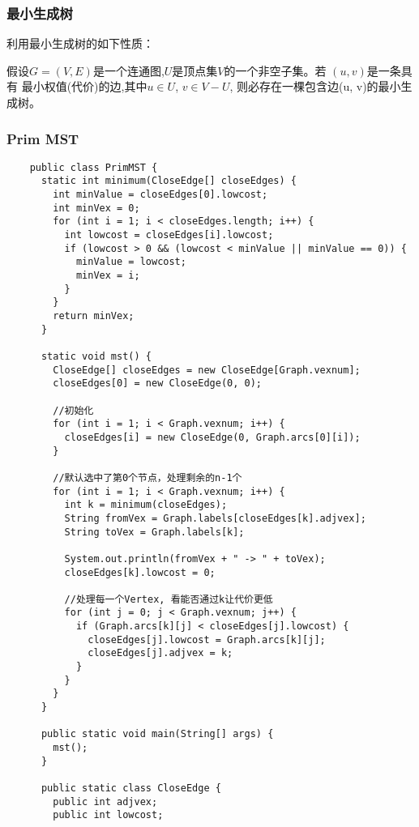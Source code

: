 \begin{frame}[fragile]
  \frametitle{最小生成树}
  利用最小生成树的如下性质：

  假设$G=(V, E)$是一个连通图,$U$是顶点集$V$的一个非空子集。若 $(u, v)$是一条具有
  最小权值(代价)的边,其中$u \in U$, $v \in V-U$, 则必存在一棵包含边(u, v)的最小生
  成树。

\end{frame}

\begin{frame}
  \frametitle{Prim MST}
  \begin{verbatim}
    public class PrimMST {
      static int minimum(CloseEdge[] closeEdges) {
        int minValue = closeEdges[0].lowcost;
        int minVex = 0;
        for (int i = 1; i < closeEdges.length; i++) {
          int lowcost = closeEdges[i].lowcost;
          if (lowcost > 0 && (lowcost < minValue || minValue == 0)) {
            minValue = lowcost;
            minVex = i;
          }
        }
        return minVex;
      }

      static void mst() {
        CloseEdge[] closeEdges = new CloseEdge[Graph.vexnum];
        closeEdges[0] = new CloseEdge(0, 0);

        //初始化
        for (int i = 1; i < Graph.vexnum; i++) {
          closeEdges[i] = new CloseEdge(0, Graph.arcs[0][i]);
        }

        //默认选中了第0个节点，处理剩余的n-1个
        for (int i = 1; i < Graph.vexnum; i++) {
          int k = minimum(closeEdges);
          String fromVex = Graph.labels[closeEdges[k].adjvex];
          String toVex = Graph.labels[k];

          System.out.println(fromVex + " -> " + toVex);
          closeEdges[k].lowcost = 0;

          //处理每一个Vertex, 看能否通过k让代价更低
          for (int j = 0; j < Graph.vexnum; j++) {
            if (Graph.arcs[k][j] < closeEdges[j].lowcost) {
              closeEdges[j].lowcost = Graph.arcs[k][j];
              closeEdges[j].adjvex = k;
            }
          }
        }
      }

      public static void main(String[] args) {
        mst();
      }

      public static class CloseEdge {
        public int adjvex;
        public int lowcost;


\end{verbatim}
\end{frame}
